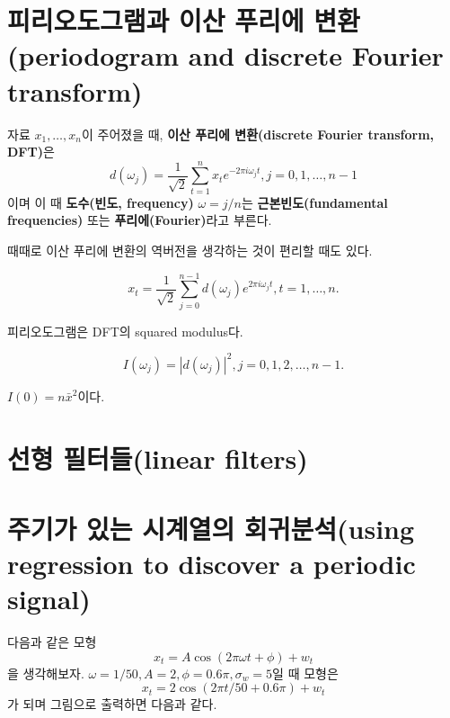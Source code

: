 \documentclass[b5paper,]{scrbook}
\theoremstyle{plain}
\theoremstyle{definition}
\numberwithin{equation}{section}
\let\BeginKnitrBlock\begin \let\EndKnitrBlock\end
\begin{document}
\hypertarget{---periodogram-and-discrete-fourier-transform}{%
\section{피리오도그램과 이산 푸리에 변환(periodogram and discrete Fourier transform)}\label{---periodogram-and-discrete-fourier-transform}}

\BeginKnitrBlock{definition}[이산 푸리에 변환]
\protect\hypertarget{def:unnamed-chunk-242}{}{\label{def:unnamed-chunk-242} {} }자료 \(x_{1},\ldots, x_{n}\)이 주어졌을 때, \textbf{이산 푸리에 변환(discrete Fourier transform, DFT)}은
\[d(\omega_{j})=\frac{1}{\sqrt{2}}\sum_{t=1}^{n}x_{t}e^{-2\pi i \omega_{j}t}, j=0,1,\ldots, n-1\]
이며 이 때 \textbf{도수(빈도, frequency)} \(\omega = j/n\)는 \textbf{근본빈도(fundamental frequencies)} 또는 \textbf{푸리에(Fourier)}라고 부른다.
\EndKnitrBlock{definition}

때때로 이산 푸리에 변환의 역버전을 생각하는 것이 편리할 때도 있다.

\BeginKnitrBlock{definition}[이산 푸리에 변환의 역버전]
\protect\hypertarget{def:unnamed-chunk-243}{}{\label{def:unnamed-chunk-243} {} }\[x_{t}=\frac{1}{\sqrt{2}}\sum_{j=0}^{n-1}d(\omega_{j})e^{2\pi i \omega_{j}t}, t=1,\ldots, n.\]
\EndKnitrBlock{definition}

피리오도그램은 DFT의 squared modulus다.

\BeginKnitrBlock{definition}[피리오도그램]
\protect\hypertarget{def:unnamed-chunk-244}{}{\label{def:unnamed-chunk-244} {} }\[I(\omega_{j})=|d(\omega_{j})|^{2}, j=0,1,2,\ldots,n-1.\]
\EndKnitrBlock{definition}

\(I(0)=n\bar{x}^{2}\)이다.

\hypertarget{-linear-filters}{%
\section{선형 필터들(linear filters)}\label{-linear-filters}}

\hypertarget{---using-regression-to-discover-a-periodic-signal}{%
\section{주기가 있는 시계열의 회귀분석(using regression to discover a periodic signal)}\label{---using-regression-to-discover-a-periodic-signal}}

다음과 같은 모형
\[x_{t}=A\cos (2\pi\omega t + \phi) + w_{t}\]
을 생각해보자. \(\omega=1/50, A=2,\phi=0.6\pi, \sigma_{w}=5\)일 때 모형은
\[x_{t}=2\cos (2\pi t /50 + 0.6 \pi) + w_{t}\]
가 되며 그림으로 출력하면 다음과 같다.
\end{document}
